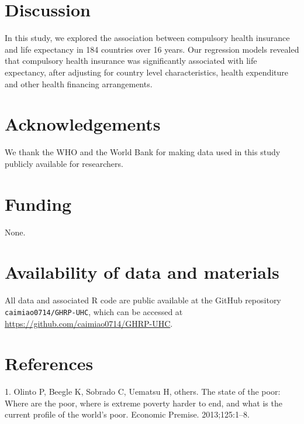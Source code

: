 \documentclass[]{elsarticle} %
\begin{document}
\hypertarget{discussion}{%
\section{Discussion}\label{discussion}}

In this study, we explored the association between compulsory health insurance and life expectancy in 184 countries over 16 years. Our regression models revealed that compulsory health insurance was significantly associated with life expectancy, after adjusting for country level characteristics, health expenditure and other health financing arrangements.

\hypertarget{acknowledgements}{%
\section*{Acknowledgements}\label{acknowledgements}}

We thank the WHO and the World Bank for making data used in this study publicly available for researchers.

\hypertarget{funding}{%
\section*{Funding}\label{funding}}

None.

\hypertarget{availability-of-data-and-materials}{%
\section*{Availability of data and materials}\label{availability-of-data-and-materials}}

All data and associated R code are public available at the GitHub repository \texttt{caimiao0714/GHRP-UHC}, which can be accessed at \url{https://github.com/caimiao0714/GHRP-UHC}.

\hypertarget{references}{%
\section*{References}\label{references}}

\hypertarget{refs}{}
\leavevmode\hypertarget{ref-olinto2013state}{}%
1. Olinto P, Beegle K, Sobrado C, Uematsu H, others. The state of the poor: Where are the poor, where is extreme poverty harder to end, and what is the current profile of the world's poor. Economic Premise. 2013;125:1--8.
\end{document}
